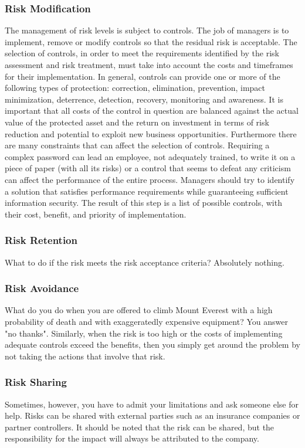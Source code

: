 \subsubsection{Risk Modification}
The management of risk levels is subject to controls. The job of managers is to implement, remove or modify controls so that the residual risk is acceptable. The selection of controls, in order to meet the requirements identified by the risk assessment and risk treatment, must take into account the costs and timeframes for their implementation. In general, controls can provide one or more of the following types of protection: correction, elimination, prevention, impact minimization, deterrence, detection, recovery, monitoring and awareness. It is important that all costs of the control in question are balanced against the actual value of the protected asset and the return on investment in terms of risk reduction and potential to exploit new business opportunities. Furthermore there are many constraints that can affect the selection of controls. Requiring a complex password can lead an employee, not adequately trained, to write it on a piece of paper (with all its risks) or a control that seems to defeat any criticism can affect the performance of the entire process. Managers should try to identify a solution that satisfies performance requirements while guaranteeing sufficient information security. The result of this step is a list of possible controls, with their cost, benefit, and priority of implementation.
\subsubsection{Risk Retention}
What to do if the risk meets the risk acceptance criteria? Absolutely nothing.
\subsubsection{Risk Avoidance}
What do you do when you are offered to climb Mount Everest with a high probability of death and with exaggeratedly expensive equipment? You answer "no thanks".
Similarly, when the risk is too high or the costs of implementing adequate controls exceed the benefits, then you simply get around the problem by not taking the actions that involve that risk.
\subsubsection{Risk Sharing}
Sometimes, however, you have to admit your limitations and ask someone else for help. Risks can be shared with external parties such as an insurance companies or partner controllers. It should be noted that the risk can be shared, but the responsibility for the impact will always be attributed to the company.
